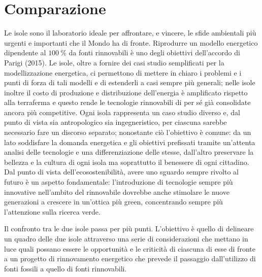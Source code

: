 \documentclass[fleqn,11pt]{SelfArx} %
\begin{document}
\section{Comparazione}
Le isole sono il laboratorio ideale per affrontare, e vincere, le sfide ambientali più urgenti e importanti che il Mondo ha di fronte.
Riprodurre un modello energetico dipendente al \(\SI{100}{\percent}\) da fonti rinnovabili è uno degli obiettivi dell'accordo di Parigi (2015). Le isole, oltre a fornire dei casi studio semplificati per la modellizzazione energetica, ci permettono di mettere in chiaro i problemi e i punti di forza di tali modelli e di estenderli a casi sempre più generali; nelle isole inoltre il costo di produzione e distribuzione dell'energia è amplificato rispetto alla terraferma e questo rende le tecnologie rinnovabili di per sé già consolidate ancora più competitive. Ogni isola rappresenta un caso studio diverso e, dal punto di vista sia antropologico sia ingegneristico, per ciascuna sarebbe necessario fare un discorso separato; nonostante ciò l'obiettivo è comune: da un lato soddisfare la domanda energetica  e gli obiettivi prefissati tramite un'attenta analisi delle tecnologie e una differenziazione delle stesse, dall'altro preservare la bellezza e la cultura di ogni isola ma soprattutto il benessere di ogni cittadino. Dal punto di vista dell'ecosostenibilità, avere uno sguardo sempre rivolto al futuro è un aspetto fondamentale: l'introduzione di tecnologie sempre più innovative nell'ambito del rinnovabile dovrebbe anche stimolare le nuove generazioni a crescere in un'ottica più green, concentrando sempre più l'attenzione sulla ricerca verde. 

Il confronto tra le due isole passa per più punti. L'obiettivo è quello di delineare un quadro delle due isole attraverso una serie di considerazioni che mettano in luce quali possano essere le opportunità e le criticità di ciascuna di esse di fronte a un progetto di rinnovamento energetico che prevede il passaggio dall'utilizzo di fonti fossili a quello di fonti rinnovabili.
\end{document}

